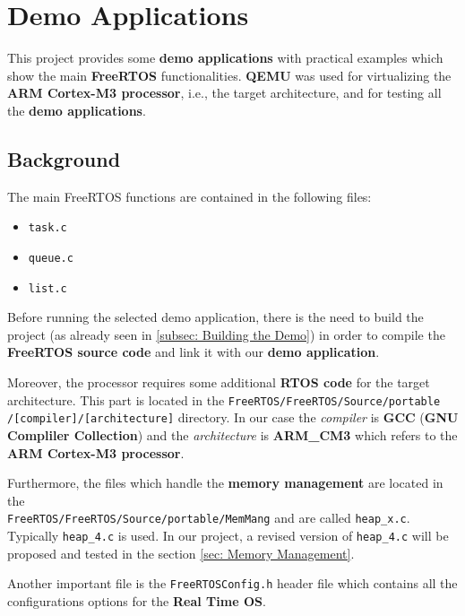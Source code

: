 \section{Demo Applications}
\label{subsec: Demo Applications}

This project provides some \textbf{demo applications} with practical examples which show the main \textbf{FreeRTOS} functionalities. \textbf{QEMU} was used for virtualizing the \textbf{ARM Cortex-M3 processor}, i.e., the target architecture, and for testing all the \textbf{demo applications}. 

\subsection{Background}
\label{subsec: Background}
The main FreeRTOS functions are contained in the following files:
\begin{itemize}
    \item \texttt{task.c}
    \item \texttt{queue.c}
    \item \texttt{list.c}
\end{itemize}

Before running the selected demo application, there is the need to build the project (as already seen in \ref{subsec: Building the Demo}) in order to compile the \textbf{FreeRTOS source code} and link it with our \textbf{demo application}.

Moreover, the processor requires some additional \textbf{RTOS code} for the target architecture.
This part is located in the \texttt{FreeRTOS/FreeRTOS/Source/portable} \texttt{/[compiler]/[architecture]} directory.
In our case the \textit{compiler} is \textbf{GCC} (\textbf{GNU Compliler Collection}) and the \textit{architecture} is \textbf{ARM\_CM3} which refers to the \textbf{ARM Cortex-M3 processor}.

Furthermore, the files which handle the \textbf{memory management} are located in the 
\\ \texttt{FreeRTOS/FreeRTOS/Source}\texttt{/portable/MemMang} and are called \texttt{heap\_x.c}. Typically \texttt{heap\_4.c} is used. In our project, a revised version of \texttt{heap\_4.c} will be proposed and tested in the section \ref{sec: Memory Management}.

Another important file is the \texttt{FreeRTOSConfig.h} header file which contains all the configurations options for the \textbf{Real Time OS}.

